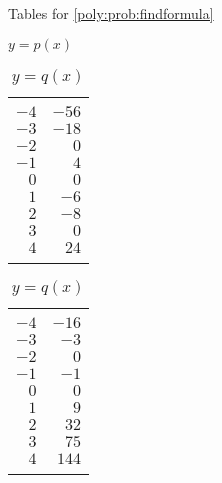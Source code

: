 \begin{exercises}
\begin{problem}
\begin{table}[!htb]
	\centering
	\begin{widepage}
	\caption{Tables for \cref{poly:prob:findformula}}
	\label{poly:tab:findformula}
	\begin{subtable}{.2\textwidth}
		\centering
		\caption{$y=p(x)$}
		\label{poly:tab:findformulap}
		\begin{tabular}{rr}
			\beforeheading
			\heading{$x$} & \heading{$y$} \\ 
			\afterheading
			$-4$          & $-56$         \\\normalline
			$-3$          & $-18$         \\\normalline
			$-2$          & $0$           \\\normalline
			$-1$          & $4$           \\\normalline
			$0$           & $0$           \\\normalline
			$1$           & $-6$          \\\normalline
			$2$           & $-8$          \\\normalline
			$3$           & $0$           \\\normalline
			$4$           & $24$          \\\lastline
		\end{tabular}
	\end{subtable}
	\hfill
	\begin{subtable}{.2\textwidth}
		\centering
		\caption{$y=q(x)$}
		\label{poly:tab:findformulaq}
		\begin{tabular}{rr}
			\beforeheading
			\heading{$x$} & \heading{$y$} \\ \afterheading
			$-4$          & $-16$         \\\normalline
			$-3$          & $-3$          \\\normalline
			$-2$          & $0$           \\\normalline
			$-1$          & $-1$          \\\normalline
			$0$           & $0$           \\\normalline
			$1$           & $9$           \\\normalline
			$2$           & $32$          \\\normalline
			$3$           & $75$          \\\normalline
			$4$           & $144$         \\\lastline
		\end{tabular}
	\end{subtable}

\end{widepage}
\end{table}
\end{problem}
\end{exercises}
